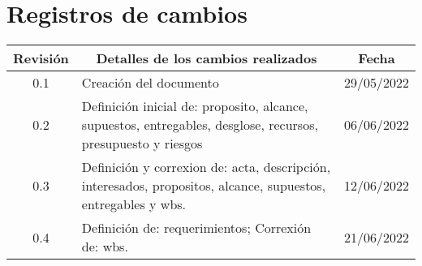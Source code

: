 \section{Registros de cambios}
\label{sec:registro}


\begin{table}[ht]
\label{tab:registro}
\centering
\begin{tabularx}{\linewidth}{@{}|c|X|c|@{}}
\hline
\rowcolor[HTML]{C0C0C0} 
Revisión & \multicolumn{1}{c|}{\cellcolor[HTML]{C0C0C0}Detalles de los cambios realizados} & Fecha      \\ \hline
0.1 & Creación del documento& 29/05/2022\\ \hline
0.2 & Definición inicial de: proposito, alcance, supuestos, entregables, desglose, recursos, presupuesto y riesgos& 06/06/2022\\ \hline
0.3 & Definición y correxion de: acta, descripción, interesados, propositos, alcance, supuestos, entregables y wbs.& 12/06/2022\\ \hline
0.4 & Definición de: requerimientos; Correxión de: wbs.& 21/06/2022\\ \hline
\end{tabularx}
\end{table}

\pagebreak
